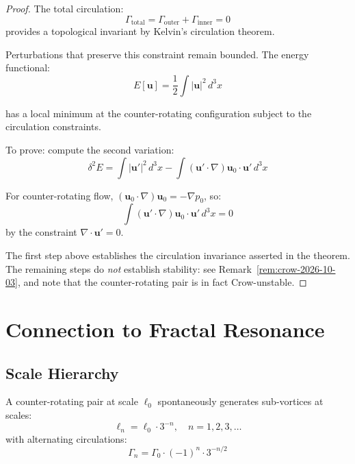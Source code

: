 \begin{proof}
The total circulation:
\begin{equation}
\Gamma_{\text{total}} = \Gamma_{\text{outer}} + \Gamma_{\text{inner}} = 0
\end{equation}
provides a topological invariant by Kelvin's circulation theorem\cite{arnold1966}.

Perturbations that preserve this constraint remain bounded. The energy functional:
\begin{equation}
E[\mathbf{u}] = \frac{1}{2}\int |\mathbf{u}|^2 \, d^3x
\end{equation}

has a local minimum at the counter-rotating configuration subject to the circulation constraints.

To prove: compute the second variation:
\begin{equation}
\delta^2 E = \int |\mathbf{u}'|^2 \, d^3x - \int (\mathbf{u}' \cdot \nabla)\mathbf{u}_0 \cdot \mathbf{u}' \, d^3x
\end{equation}

For counter-rotating flow, $(\mathbf{u}_0 \cdot \nabla)\mathbf{u}_0 = -\nabla p_0$, so:
\begin{equation}
\int (\mathbf{u}' \cdot \nabla)\mathbf{u}_0 \cdot \mathbf{u}' \, d^3x = 0
\end{equation}
by the constraint $\nabla \cdot \mathbf{u}' = 0$.

The first step above establishes the circulation invariance asserted in the
theorem. The remaining steps do \emph{not} establish stability: see
Remark~\ref{rem:crow-2026-10-03}, and note that the counter-rotating pair is in
fact Crow-unstable.
\end{proof}

\section{Connection to Fractal Resonance}

\subsection{Scale Hierarchy}

\begin{mechanism}\label{mech:fractal-vortex}
A counter-rotating pair at scale $\ell_0$ spontaneously generates sub-vortices at scales:
\begin{equation}
\ell_n = \ell_0 \cdot 3^{-n}, \quad n = 1, 2, 3, \ldots
\end{equation}
with alternating circulations:
\begin{equation}
\Gamma_n = \Gamma_0 \cdot (-1)^n \cdot 3^{-n/2}
\end{equation}
\end{mechanism}

